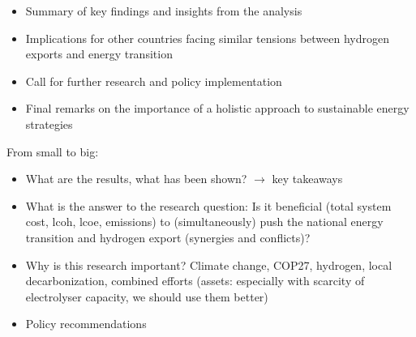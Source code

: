 \begin{itemize}
    \item Summary of key findings and insights from the analysis
    \item Implications for other countries facing similar tensions between hydrogen exports and energy transition
    \item Call for further research and policy implementation
    \item Final remarks on the importance of a holistic approach to sustainable energy strategies
\end{itemize}

From small to big:
\begin{itemize}
    \item What are the results, what has been shown? $\rightarrow$ key takeaways
    \item What is the answer to the research question: Is it beneficial (total system cost, lcoh, lcoe, emissions)
    to (simultaneously) push the national energy transition
    and hydrogen export (synergies and conflicts)?
    \item Why is this research important? Climate change, COP27, hydrogen, local decarbonization, combined efforts (assets: especially with scarcity of electrolyser capacity, we should use them better)
    \item Policy recommendations
\end{itemize}
